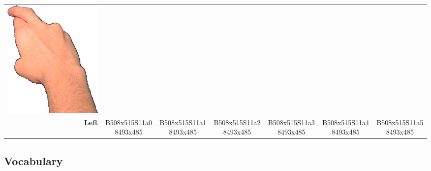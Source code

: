 \documentclass{article}
\begin{document}
\begin{center}
\begin{tabular}{r*{6}{c}}
\includegraphics[scale=0.1]{images/02-06-6.jpg}\\
\textbf{Left}&
B508x515S11a08493x485&
B508x515S11a18493x485&
B508x515S11a28493x485&
B508x515S11a38493x485&
B508x515S11a48493x485&
B508x515S11a58493x485\\
\end{tabular}
\end{center}

\subsection{Vocabulary}
\end{document}
